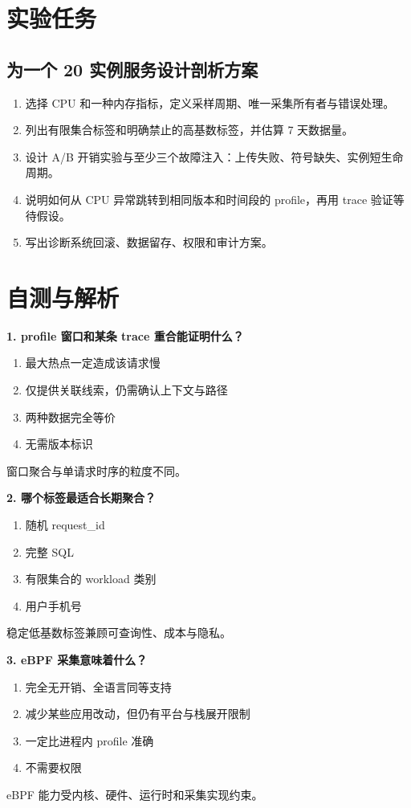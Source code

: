 \documentclass[UTF8,fontset=fandol,openany,11pt]{ctexbook}
\begin{document}
\section{实验任务}
\subsection*{为一个 20 实例服务设计剖析方案}
\begin{enumerate}
\item 选择 CPU 和一种内存指标，定义采样周期、唯一采集所有者与错误处理。

\item 列出有限集合标签和明确禁止的高基数标签，并估算 7 天数据量。

\item 设计 A/B 开销实验与至少三个故障注入：上传失败、符号缺失、实例短生命周期。

\item 说明如何从 CPU 异常跳转到相同版本和时间段的 profile，再用 trace 验证等待假设。

\item 写出诊断系统回滚、数据留存、权限和审计方案。

\end{enumerate}
\section{自测与解析}
\noindent\textbf{1. profile 窗口和某条 trace 重合能证明什么？}
\begin{enumerate}[label=\Alph*.]
\item 最大热点一定造成该请求慢
\item 仅提供关联线索，仍需确认上下文与路径
\item 两种数据完全等价
\item 无需版本标识
\end{enumerate}
窗口聚合与单请求时序的粒度不同。

\noindent\textbf{2. 哪个标签最适合长期聚合？}
\begin{enumerate}[label=\Alph*.]
\item 随机 request\_id
\item 完整 SQL
\item 有限集合的 workload 类别
\item 用户手机号
\end{enumerate}
稳定低基数标签兼顾可查询性、成本与隐私。

\noindent\textbf{3. eBPF 采集意味着什么？}
\begin{enumerate}[label=\Alph*.]
\item 完全无开销、全语言同等支持
\item 减少某些应用改动，但仍有平台与栈展开限制
\item 一定比进程内 profile 准确
\item 不需要权限
\end{enumerate}
eBPF 能力受内核、硬件、运行时和采集实现约束。
\end{document}
